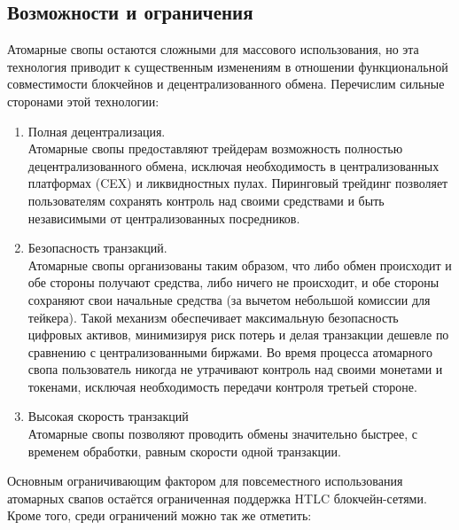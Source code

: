 \subsection{Возможности и ограничения}

Атомарные свопы остаются сложными для массового использования, но эта технология приводит к существенным изменениям в отношении функциональной совместимости блокчейнов и децентрализованного обмена. Перечислим сильные сторонами этой технологии:

\begin{enumerate}
\item Полная децентрализация.\\
Атомарные свопы предоставляют трейдерам возможность полностью децентрализованного обмена, исключая необходимость в централизованных платформах (CEX) и ликвидностных пулах. Пиринговый трейдинг позволяет пользователям сохранять контроль над своими средствами и быть независимыми от централизованных посредников.

\item Безопасность транзакций.\\
Атомарные свопы организованы таким образом, что либо обмен происходит и обе стороны получают средства, либо ничего не происходит, и обе стороны сохраняют свои начальные средства (за вычетом небольшой комиссии для тейкера). Такой механизм обеспечивает максимальную безопасность цифровых активов, минимизируя риск потерь и делая транзакции дешевле по сравнению с централизованными биржами. Во время процесса атомарного свопа пользователь никогда не утрачивают контроль над своими монетами и токенами, исключая необходимость передачи контроля третьей стороне.

\item Высокая скорость транзакций\\
Атомарные свопы позволяют проводить обмены значительно быстрее, с временем обработки, равным скорости одной транзакции.
\end{enumerate}

Основным ограничивающим фактором для повсеместного использования атомарных свапов остаётся ограниченная поддержка HTLC блокчейн-сетями. Кроме того, среди ограничений можно так же отметить:

